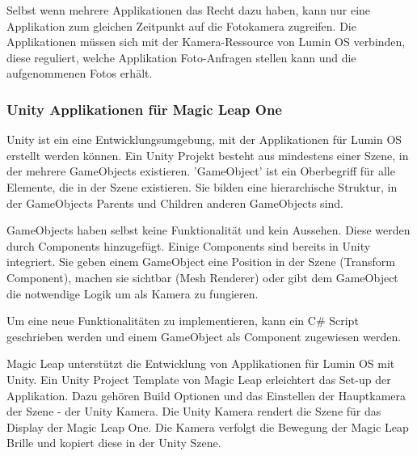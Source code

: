 Selbst wenn mehrere Applikationen das Recht dazu haben, kann nur eine Applikation zum gleichen Zeitpunkt auf die Fotokamera zugreifen. Die Applikationen müssen sich mit der Kamera-Ressource von Lumin OS verbinden, diese reguliert, welche Applikation Foto-Anfragen stellen kann und die aufgenommenen Fotos erhält. 


%

\subsubsection{Unity Applikationen für Magic Leap One}
%
Unity ist ein eine Entwicklungsumgebung, mit der Applikationen für Lumin OS erstellt werden können. Ein Unity Projekt besteht aus mindestens einer Szene, in der mehrere GameObjects existieren. 'GameObject' ist ein Oberbegriff für alle Elemente, die in der Szene existieren. Sie bilden eine hierarchische Struktur, in der GameObjects Parents und Children anderen GameObjects sind.\citep{unitygameobject}

GameObjects haben selbst keine Funktionalität und kein Aussehen. Diese werden durch Components hinzugefügt. Einige Components sind bereits in Unity integriert. Sie geben einem GameObject eine Position in der Szene (Transform Component), machen sie sichtbar (Mesh Renderer) oder gibt dem GameObject die notwendige Logik um als Kamera zu fungieren. 

Um eine neue Funktionalitäten zu implementieren, kann ein C\# Script geschrieben werden und einem GameObject als Component zugewiesen werden.

Magic Leap unterstützt die Entwicklung von Applikationen für Lumin OS mit Unity. Ein Unity Project Template von Magic Leap erleichtert das Set-up der Applikation. Dazu gehören Build Optionen und das Einstellen der Hauptkamera der Szene - der Unity Kamera. Die Unity Kamera rendert die Szene für das Display der Magic Leap One. Die Kamera verfolgt die Bewegung der Magic Leap Brille und kopiert diese in der Unity Szene. %

